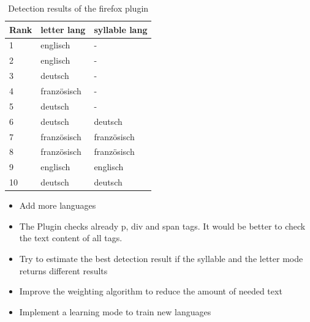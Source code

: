\begin{frame}[c]

\begin{table}
\begin{tabular}{|l|l|l|}
\hline
\textbf{Rank} &\textbf{letter lang}&\textbf{syllable lang}\\
\hline
1 &englisch&-\\
2 &englisch&-\\
3&deutsch&-\\
4&französisch&-\\
5&deutsch&-\\
6&deutsch&deutsch\\
7&französisch&französisch\\
8&französisch&französisch\\
9&englisch&englisch\\
10&deutsch&deutsch\\
\hline
\end{tabular}
\caption{Detection results of the firefox plugin}
\label{tablelabel}
\end{table}

\end{frame}

\begin{frame}[c]
	
	\begin{itemize}
	\begin{itemize}
		\item Add more languages
	\end{itemize}
	
	  \begin{itemize}
  	    \item The Plugin checks already p, div and span tags. It would be better
  	  to check the text content of all tags.
  	    \item Try to estimate the best detection result if the syllable and the
  	letter mode returns different results
      \end{itemize}
      \begin{itemize}
  		\item Improve the weighting algorithm to reduce the amount of needed text
  		\item Implement a learning mode to train new languages

	\end{itemize}
	\end{itemize}
\end{frame}